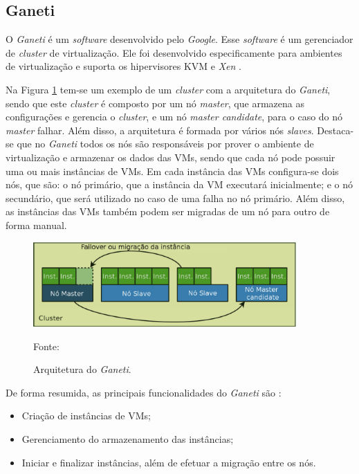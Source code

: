 \subsection{Ganeti}
\label{section:ganeti}
O \textit{Ganeti} \cite{ganeti} é um \textit{software} desenvolvido pelo \textit{Google}. Esse \textit{software} é um gerenciador de 
\textit{cluster} de virtualização. Ele foi desenvolvido especificamente para ambientes de virtualização e suporta os hipervisores 
\ac{KVM} \cite{kvm} e \textit{Xen} \cite{xen}. 

Na Figura \ref{fig:ganeti_arquitetura} tem-se um exemplo de um \textit{cluster} com a arquitetura do \textit{Ganeti}, sendo que este 
\textit{cluster} é composto por um nó \textit{master}, que armazena as configurações e gerencia o \textit{cluster}, e um nó 
\textit{master candidate}, para o caso do nó \textit{master} falhar. Além disso, a arquitetura é formada por vários nós \textit{slaves}. 
Destaca-se que no \textit{Ganeti} todos os nós são responsáveis por prover o ambiente de virtualização e armazenar os dados das \acp{VM}, 
sendo que cada nó pode possuir uma ou mais instâncias de \acp{VM}. Em cada instância das \acp{VM} configura-se dois nós, que são: o nó primário, 
que a instância da \ac{VM} executará inicialmente; e o nó secundário, que será utilizado no caso de uma falha no nó primário.
Além disso, as instâncias das \acp{VM} também podem ser migradas de um nó para outro de forma manual. 

\begin{figure}[h!]
 \centering
 \includegraphics[width=380px]{img/ganeti_arquitetura.eps}
 \caption{Arquitetura do \textit{Ganeti}.}
 Fonte: \citet{carvalho2011}
 \label{fig:ganeti_arquitetura}
\end{figure}

De forma resumida, as principais funcionalidades do \textit{Ganeti} são \cite{ganeti}:
\begin{itemize}
 \item Criação de instâncias de \acp{VM};
 \item Gerenciamento do armazenamento das instâncias;
 \item Iniciar e finalizar instâncias, além de efetuar a migração entre os nós.
\end{itemize}

